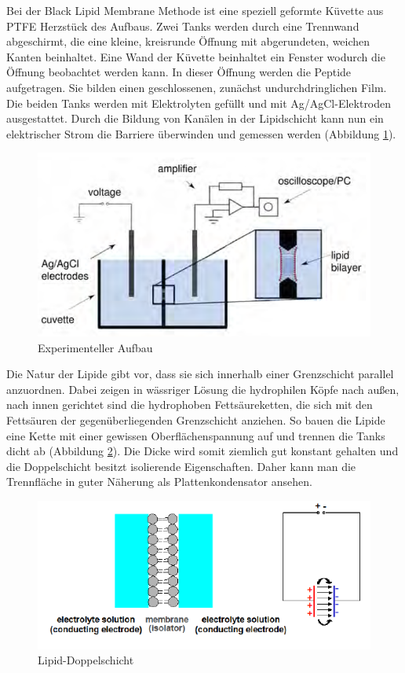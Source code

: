 \documentclass{include/thesisclass3}
\begin{document}
Bei der Black Lipid Membrane Methode ist eine speziell geformte Küvette aus PTFE Herzstück des Aufbaus. Zwei Tanks werden durch eine Trennwand abgeschirmt, die eine kleine, kreisrunde Öffnung mit abgerundeten, weichen Kanten beinhaltet. Eine Wand der Küvette beinhaltet ein Fenster wodurch die Öffnung beobachtet werden kann. In dieser Öffnung werden die Peptide aufgetragen. Sie bilden einen geschlossenen, zunächst undurchdringlichen Film. Die beiden Tanks werden mit Elektrolyten gefüllt und mit Ag/AgCl-Elektroden ausgestattet. Durch die Bildung von Kanälen in der Lipidschicht kann nun ein elektrischer Strom die Barriere überwinden und gemessen werden (Abbildung \ref{aufbau}).\\
\begin{figure}[ht]
	\begin{center}
		\includegraphics{images/experiment.png}
		\caption{Experimenteller Aufbau}
		\label{aufbau}
	\end{center}
\end{figure}
Die Natur der Lipide gibt vor, dass sie sich innerhalb einer Grenzschicht parallel anzuordnen. Dabei zeigen in wässriger Lösung die hydrophilen Köpfe nach außen, nach innen gerichtet sind die hydrophoben Fettsäureketten, die sich mit den Fettsäuren der gegenüberliegenden Grenzschicht anziehen. So bauen die Lipide eine Kette mit einer gewissen Oberflächenspannung auf und trennen die Tanks dicht ab (Abbildung \ref{double}). Die Dicke wird somit ziemlich gut konstant gehalten und die Doppelschicht besitzt isolierende Eigenschaften. Daher kann man die Trennfläche in guter Näherung als Plattenkondensator ansehen.\\
\begin{figure}[ht]
	\begin{center}
		\includegraphics{images/lipid-doublelayer.png}
		\caption{Lipid-Doppelschicht}
	\label{double}
	\end{center}
\end{figure}
\end{document}
